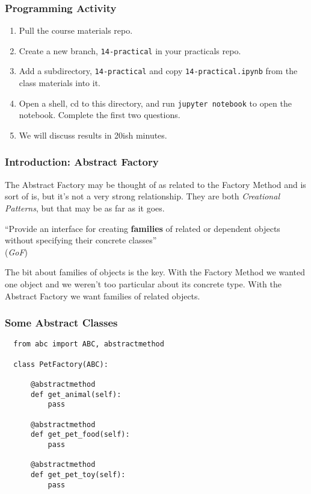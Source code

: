\documentclass[10pt]{beamer}
\begin{document}
\begin{frame}
  \frametitle{Programming Activity}
  
  \begin{enumerate}
    \item Pull the course materials repo.
    \item Create a new branch, \texttt{14-practical} in your practicals repo.
    \item Add a subdirectory,  \texttt{14-practical} and copy \texttt{14-practical.ipynb} from the class materials into it.
    \item Open a shell, cd to this directory, and run \texttt{jupyter notebook} to open the notebook. Complete the first two questions.
    \item We will discuss results in 20ish minutes.
  \end{enumerate}      
\end{frame}
\begin{frame}[fragile]
  \frametitle{Introduction: Abstract Factory}
  
  The Abstract Factory may be thought of as related to the Factory Method and 
  is sort of is, but it's not a very strong relationship. They are both \emph{Creational
  Patterns}, but that may be as far as it goes.
    
  \vspace{5mm}
  ``Provide an interface for creating \textbf{families} of related or dependent objects without 
  specifying their concrete classes'' \\
  (\emph{GoF})
  
  \vspace{5mm}
  The bit about families of objects is the key. With the Factory Method we wanted one object and we weren't 
  too particular about its concrete type. With the Abstract Factory we want families of related objects.

  
  \end{frame}
  
\begin{frame}[fragile]
  \frametitle{Some Abstract Classes}

  
  \begin{verbatim}
  from abc import ABC, abstractmethod
  
  class PetFactory(ABC):
      
      @abstractmethod
      def get_animal(self):
          pass
        
      @abstractmethod  
      def get_pet_food(self):
          pass
      
      @abstractmethod 
      def get_pet_toy(self):
          pass        
  
  \end{verbatim}
\end{frame}  
\end{document}
